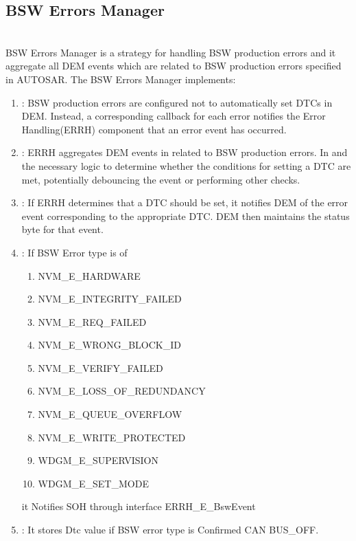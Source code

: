 \subsection{BSW Errors Manager}
\\
BSW Errors Manager is a strategy for handling BSW production errors and it aggregate all DEM events which are related to BSW production errors specified in AUTOSAR.
The BSW Errors Manager implements:
\begin{enumerate}
    \item {}: BSW production errors are configured not to automatically set DTCs in DEM. Instead, a corresponding callback for each error  notifies the Error Handling(ERRH) component that an error event has occurred.
    \item {}: ERRH aggregates DEM events in  related to BSW production errors. In  and  the necessary logic to determine whether the conditions for setting a DTC are met, potentially debouncing the event or performing other checks.
    \item {}: If ERRH determines that a DTC should be set, it notifies DEM of the error event corresponding to the appropriate DTC. DEM then maintains the status byte for that event.
	\item {}: If BSW Error type is of
									\begin{enumerate} 	
									\item NVM_E_HARDWARE
									\item NVM_E_INTEGRITY_FAILED
									\item NVM_E_REQ_FAILED
									\item NVM_E_WRONG_BLOCK_ID
									\item NVM_E_VERIFY_FAILED
									\item NVM_E_LOSS_OF_REDUNDANCY
									\item NVM_E_QUEUE_OVERFLOW
									\item NVM_E_WRITE_PROTECTED
									\item WDGM_E_SUPERVISION
									\item WDGM_E_SET_MODE
									\end{enumerate}		
	it Notifies SOH through interface ERRH_E_BswEvent
	\item {}: It stores Dtc value if BSW error type is Confirmed CAN BUS_OFF.
\end{enumerate} 

